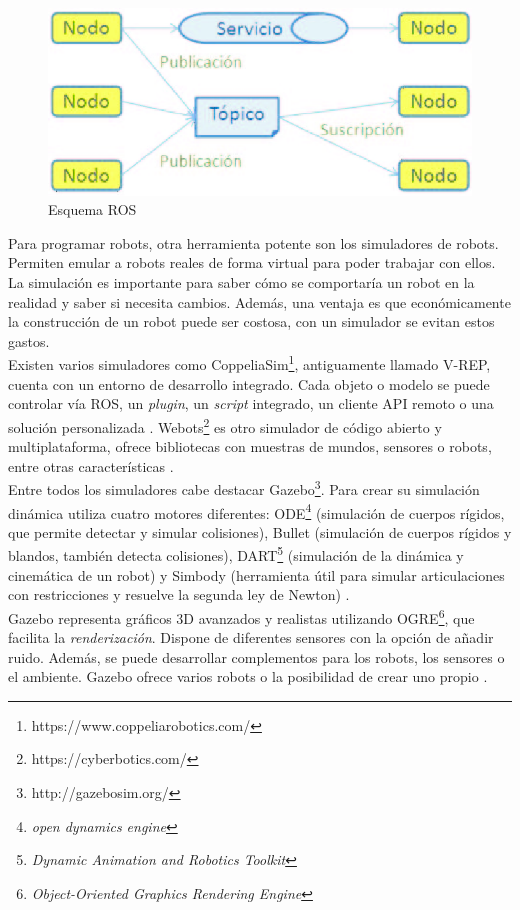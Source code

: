 \begin{figure}[H]
    \centering
    \includegraphics[width=12cm, keepaspectratio]{img/ros.png}
    \caption{Esquema ROS}
    \label{fig:ros}
\end{figure}
\newpage
Para programar robots, otra herramienta potente son los simuladores de robots. Permiten emular a robots reales de forma virtual para poder trabajar con ellos. La simulación es importante para saber cómo se comportaría un robot en la realidad y saber si necesita cambios. Además, una ventaja es que económicamente la construcción de un robot puede ser costosa, con un simulador se evitan estos gastos.\\

Existen varios simuladores como CoppeliaSim\footnote{https://www.coppeliarobotics.com/}, antiguamente llamado V-REP, cuenta con un entorno de desarrollo integrado. Cada objeto o modelo se puede controlar vía ROS, un \textit{plugin}, un \textit{script} integrado, un cliente API remoto o una solución personalizada \cite{sim}.  Webots\footnote{https://cyberbotics.com/} es otro simulador de código abierto y multiplataforma, ofrece bibliotecas con muestras de mundos, sensores o robots, entre otras características \cite{körber2021comparing}.\\

Entre todos los simuladores cabe destacar Gazebo\footnote{http://gazebosim.org/}. Para crear su simulación dinámica utiliza cuatro motores diferentes: ODE\footnote{\textit{open dynamics engine}} (simulación de cuerpos rígidos, que permite detectar y simular colisiones), Bullet (simulación de cuerpos rígidos y blandos, también detecta colisiones), DART\footnote{\textit{Dynamic Animation and Robotics Toolkit}} (simulación de la dinámica y cinemática de un robot) y Simbody (herramienta útil para simular articulaciones con restricciones y resuelve la segunda ley de Newton) \cite{upm56724}.\\

Gazebo representa gráficos 3D avanzados y realistas utilizando OGRE\footnote{\textit{Object-Oriented Graphics Rendering Engine}}, que facilita la \textit{renderización}. Dispone de diferentes sensores con la opción de añadir ruido. Además, se puede desarrollar complementos para los robots, los sensores o el ambiente. Gazebo ofrece varios robots o la posibilidad de crear uno propio \cite{gaz}.
\newpage
